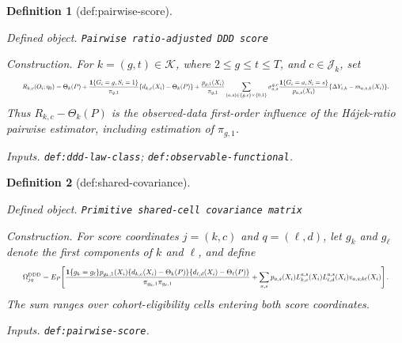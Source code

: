 \documentclass{article}
\newtheorem{definition}{Definition}
\begin{document}
\begin{definition}[def:pairwise-score]\label{def:pairwise-score}
\par\smallskip\noindent\emph{Defined object.} \texttt{Pairwise ratio-\allowbreak{}adjusted DDD score}
\par\smallskip\noindent\emph{Construction.} For \(k=(g,t)\in\mathcal K\), where \(2\le g\le t\le T\), and \(c\in\mathcal J_k\), set \[
\makebox[\linewidth][c]{\resizebox{0.98\linewidth}{!}{\leavevmode\par\noindent \makebox[\linewidth][c]{\resizebox{0.98\linewidth}{!}{\(\displaystyle \displaystyle R_{k,c}(O_i;\eta_0)=\Theta_k(P)+\frac{\mathbf 1\{G_i=g,S_i=1\}}{\pi_{g,1}}\{d_{k,c}(X_i)-\Theta_k(P)\}+\frac{p_{g,1}(X_i)}{\pi_{g,1}}\sum_{(a,s)\in\{g,c\}\times\{0,1\}}\sigma_{a,s}^{g,c}\frac{\mathbf 1\{G_i=a,S_i=s\}}{p_{a,s}(X_i)}\{\Delta Y_{i,k}-m_{a,s,k}(X_i)\}.\)}}\par\noindent}}
\] Thus \(R_{k,c}-\Theta_k(P)\) is the observed-data first-order influence of the Hájek-ratio pairwise estimator, including estimation of \(\pi_{g,1}\).
\par\smallskip\noindent\emph{Inputs.} \texttt{def:\allowbreak{}ddd-\allowbreak{}law-\allowbreak{}class}; \texttt{def:\allowbreak{}observable-\allowbreak{}functional}.
\end{definition}

\begin{definition}[def:shared-covariance]\label{def:shared-covariance}
\par\smallskip\noindent\emph{Defined object.} \texttt{Primitive shared-\allowbreak{}cell covariance matrix}
\par\smallskip\noindent\emph{Construction.} For score coordinates \(j=(k,c)\) and \(q=(\ell,d)\), let \(g_k\) and \(g_\ell\) denote the first components of \(k\) and \(\ell\), and define \[
\makebox[\linewidth][c]{\resizebox{0.98\linewidth}{!}{\leavevmode\par\noindent \makebox[\linewidth][c]{\resizebox{0.98\linewidth}{!}{\(\displaystyle \displaystyle \Omega^{\mathrm{DDD}}_{j q}=E_P\!\left[\frac{\mathbf 1\{g_k=g_\ell\}p_{g_k,1}(X_i)\{d_{k,c}(X_i)-\Theta_k(P)\}\{d_{\ell,d}(X_i)-\Theta_\ell(P)\}}{\pi_{g_k,1}\pi_{g_\ell,1}}+\sum_{a,s}p_{a,s}(X_i)L_{k,c}^{a,s}(X_i)L_{\ell,d}^{a,s}(X_i)v_{a,s;k\ell}(X_i)\right].\)}}\par\noindent}}
\] The sum ranges over cohort-eligibility cells entering both score coordinates.
\par\smallskip\noindent\emph{Inputs.} \texttt{def:\allowbreak{}pairwise-\allowbreak{}score}.
\end{definition}
\end{document}
